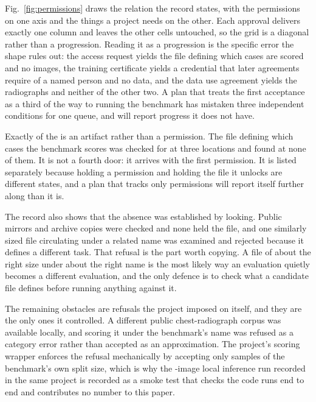 Fig.~\ref{fig:permissions} draws the relation the record states, with the
permissions on one axis and the things a project needs on the other. Each
approval delivers exactly one column and leaves the other
\NPermissionPairs{} cells untouched, so the grid is a diagonal rather than a
progression. Reading it as a progression is the specific error the shape rules
out: the access request yields the file defining which cases are scored and no
images, the training certificate yields a credential that later agreements
require of a named person and no data, and the data use agreement yields the
radiographs and neither of the other two. A plan that treats the first
acceptance as a third of the way to running the benchmark has mistaken three
independent conditions for one queue, and will report progress it does not
have.

Exactly \NArtifactLocks{} of the \NLocks{} is an artifact rather than a
permission. The file defining which cases the benchmark scores was checked for
at three locations and found at none of them. It is not a fourth door: it
arrives with the first permission. It is listed separately because holding a
permission and holding the file it unlocks are different states, and a plan
that tracks only permissions will report itself further along than it is.

The record also shows that the absence was established by looking. Public
mirrors and archive copies were checked and none held the file, and one
similarly sized file circulating under a related name was examined and
rejected because it defines a different task. That refusal is the part worth
copying. A file of about the right size under about the right name is the most
likely way an evaluation quietly becomes a different evaluation, and the only
defence is to check what a candidate file defines before running anything
against it.

The remaining \NSubstitutionLocks{} obstacles are refusals the project imposed
on itself, and they are the only ones it controlled. A different public
chest-radiograph corpus was available locally, and scoring it under the
benchmark's name was refused as a category error rather than accepted as an
approximation. The project's scoring wrapper enforces the refusal mechanically
by accepting only samples of the benchmark's own split size, which is why the
\HarnessImages{}-image local inference run recorded in the same project is
recorded as a smoke test that checks the code runs end to end and contributes
no number to this paper.

